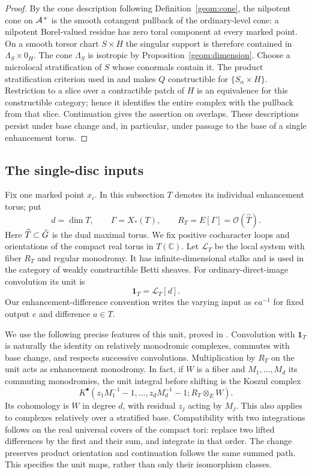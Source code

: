 \begin{proof}
By the cone description following Definition~\ref{geom:cone}, the
nilpotent cone on $\mathcal A^+$ is the
smooth cotangent pullback of the ordinary-level cone: a nilpotent
Borel-valued residue has zero toral component at every marked point.
On a smooth torsor chart $S\times H$ the singular support is therefore
contained in $\Lambda_S\times0_H$.  The cone $\Lambda_S$ is isotropic
by Proposition~\ref{geom:dimension}.  Choose a microlocal
stratification of $S$ whose conormals contain it.  The product
stratification criterion used in \cite[proof of Proposition~6.3.2]{NY} and
\cite[Lemma~7.1]{CT} makes $Q$ constructible for
$\{S_\alpha\times H\}$.  Restriction to a slice over a contractible
patch of $H$ is an equivalence for this constructible category; hence
it identifies the entire complex with the pullback from that slice.
Continuation gives the assertion on overlaps.  These descriptions
persist under base change and, in particular, under passage to the
base of a single enhancement torus.
\end{proof}

\subsection{The single-disc inputs}

Fix one marked point $x_i$.  In this subsection $T$ denotes its
individual enhancement torus; put
\[
 d=\dim T,\qquad \Gamma=X_*(T),\qquad
 R_T=E[\Gamma]=\mathcal O(\widehat T).
\]
Here $\widehat T\subset\check G$ is the dual maximal torus.
We fix positive cocharacter loops and orientations of the compact
real torus in $T(\mathbb C)$.  Let $\mathscr L_T$ be the local system
with fiber $R_T$ and regular monodromy.  It has infinite-dimensional
stalks and is used in the category of weakly constructible Betti
sheaves.  For ordinary-direct-image convolution its unit is
\begin{equation}\label{desc:unit}
                         \mathbf1_T=\mathscr L_T[d].
\end{equation}
Our enhancement-difference convention writes the varying input as
$e a^{-1}$ for fixed output $e$ and difference $a\in T$.

We use the following precise features of this unit, proved in
\cite[Lemma~7.2]{CT}.  Convolution with $\mathbf1_T$ is naturally the
identity on relatively monodromic complexes, commutes with base
change, and respects successive convolutions.  Multiplication by
$R_T$ on the unit acts as enhancement monodromy.  In fact, if $W$ is
a fiber and $M_1,\ldots,M_d$ its commuting monodromies, the unit
integral before shifting is the Koszul complex
\[
 K^\bullet(z_1M_1^{-1}-1,\ldots,z_dM_d^{-1}-1;
                                      R_T\otimes_E W).
\]
Its cohomology is $W$ in degree $d$, with residual $z_j$ acting by
$M_j$.  This also applies to complexes relatively over a stratified
base.  Compatibility with two integrations follows on the real
universal covers of the compact tori: replace two lifted differences
by the first and their sum, and integrate in that order.  The change
preserves product orientation and continuation follows the same
summed path.  This specifies the unit maps, rather than only their
isomorphism classes.

